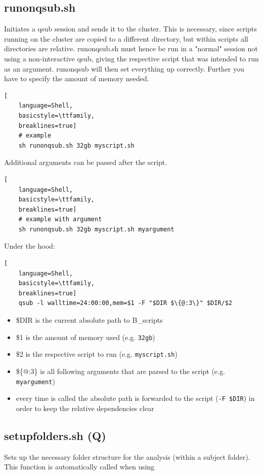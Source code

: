 \documentclass[12pt,a4paper]{scrartcl}
\begin{document}
\subsection{runonqsub.sh}
\label{sh:runQsub}
Initiates a qsub session and sends it to the cluster. This is necessary, since scripts running on the cluster are copied to a different directory, but within scripts all directories are relative. runonqsub.sh must hence be run in a "normal" session not using a non-interactive qsub, giving the respective script that was intended to run as an argument. runonqsub will then set everything up correctly. Further you have to specify the amount of memory needed.
\begin{lstlisting}[
    language=Shell,
    basicstyle=\ttfamily,
    breaklines=true]
    # example
    sh runonqsub.sh 32gb myscript.sh
\end{lstlisting}

\noindent Additional arguments can be passed after the script.\\
\begin{lstlisting}[
    language=Shell,
    basicstyle=\ttfamily,
    breaklines=true]
    # example with argument
    sh runonqsub.sh 32gb myscript.sh myargument
\end{lstlisting}
\noindent Under the hood:
\begin{lstlisting}[
    language=Shell,
    basicstyle=\ttfamily,
    breaklines=true]
    qsub -l walltime=24:00:00,mem=$1 -F "$DIR $\{@:3\}" $DIR/$2
\end{lstlisting}
\begin{itemize}
\item \$DIR is the current absolute path to B\_scripts
\item \$1 is the amount of memory used (e.g. \texttt{32gb})
\item \$2 is the respective script to run (e.g. \texttt{myscript.sh})
\item \$\{@:3\} is all following arguments that are parsed to the script (e.g. \texttt{myargument})
\item every time \texttt{} is called the absolute path is forwarded to the script (\texttt{-F \$DIR}) in order to keep the relative dependencies clear
\end{itemize}

\subsection{setupfolders.sh (Q)}
\label{sh:setDir}
Sets up the necessary folder structure for the analysis (within a subject folder). This function is automatically called when using \texttt{}\\
\end{document}
